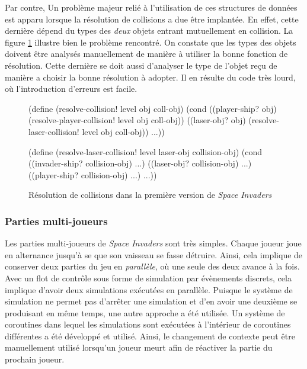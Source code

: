 \documentclass[12pt,twoside,letterpaper,francais]{book}
\newcommand{\si}{{\textit{Space Invaders }}}
\begin{document}
Par contre, Un problème majeur relié à l'utilisation de ces structures
de données est apparu lorsque la résolution de collisions a due être
implantée. En effet, cette dernière dépend du types des \emph{deux}
objets entrant mutuellement en collision. La figure
\ref{Exp:si1-col-res} illustre bien le problème rencontré. On constate
que les types des objets doivent être analysés manuellement de manière
à utiliser la bonne fonction de résolution. Cette dernière se doit
aussi d'analyser le type de l'objet reçu de manière a choisir la bonne
résolution à adopter. Il en résulte du code très lourd, où
l'introduction d'erreurs est facile.\\

\begin{figure}[htb!]
  \begin{schemecode}
(define (resolve-collision! level obj coll-obj)
  (cond
   ((player-ship? obj) (resolve-player-collision! level obj coll-obj))
   ((laser-obj? obj) (resolve-laser-collision! level obj coll-obj))
   ...))

(define (resolve-laser-collision! level laser-obj collision-obj)
  (cond ((invader-ship? collision-obj) ...)
        ((laser-obj? collision-obj) ...)
        ((player-ship? collision-obj) ...)
        ...))
  \end{schemecode}
  \caption{Résolution de collisions dans la première version de \si}
  \label{Exp:si1-col-res}
\end{figure}


\FloatBarrier
\subsubsection{Parties multi-joueurs}
Les parties multi-joueurs de \si sont très simples. Chaque joueur joue
en alternance jusqu'à se que son vaisseau se fasse détruire. Ainsi,
cela implique de conserver deux parties du jeu en \emph{parallèle}, où
une seule des deux avance à la fois. Avec un flot de contrôle sous
forme de simulation par évènements discrets, cela implique d'avoir
deux simulations exécutées en parallèle. Puisque le système de
simulation ne permet pas d'arrêter une simulation et d'en avoir une
deuxième se produisant en même temps, une autre approche a été
utilisée. Un système de coroutines dans lequel les simulations sont
exécutées à l'intérieur de coroutines différentes a été développé et
utilisé. Ainsi, le changement de contexte peut être manuellement
utilisé lorsqu'un joueur meurt afin de réactiver la partie du prochain
joueur.
\end{document}
